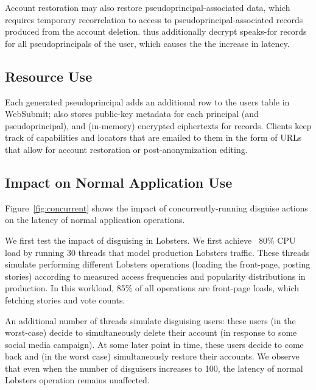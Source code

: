 Account restoration may also restore pseudoprincipal-associated data, which requires temporary
recorrelation to access to pseudoprincipal-associated records produced from the account deletion.
\sys thus additionally decrypt speaks-for records for all pseudoprincipals of the user, which causes
the the increase in latency.

\subsection{Resource Use}
\label{s:eval-res}

Each generated pseudoprincipal adds an additional row to the users table in WebSubmit; \sys also
stores public-key metadata for each principal (and pseudoprincipal), and (in-memory) encrypted
ciphertexts for records.  Clients keep track of capabilities and locators that are emailed to them in
the form of URLs that allow for account restoration or post-anonymization editing.

\subsection{Impact on Normal Application Use}
\label{s:eval-conc}

Figure~\ref{fig:concurrent} shows the impact of concurrently-running disguise actions on the latency
of normal application operations.

We first test the impact of disguising in Lobsters. We first achieve ~80\% CPU load by running
30 threads that model production Lobsters traffic. These threads simulate performing different
Lobsters operations (\eg loading the front-page, posting stories) according to measured access
frequencies and popularity distributions in production. In this workload, 85\% of all
operations are front-page loads, which fetching stories and vote counts.

An additional number of threads simulate disguising users: these users (in the worst-case) decide to
simultaneously delete their account (\eg in response to some social media campaign). At some later
point in time, these users decide to come back and (in the worst case) simultaneously restore their
accounts.
We observe that even when the number of disguisers increases to 100, the latency of normal Lobsters
operation remains unaffected.

